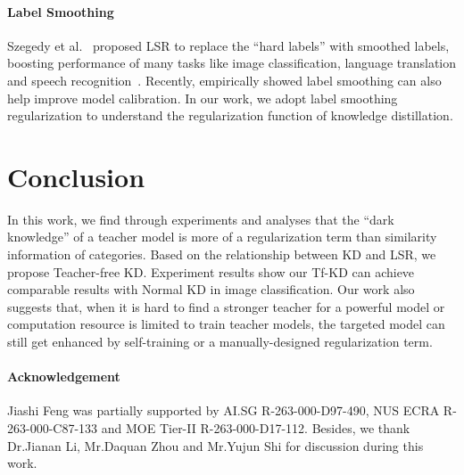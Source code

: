 \documentclass[10pt,twocolumn,letterpaper]{article}
\begin{document}
\vspace{-14pt}
\paragraph{Label Smoothing} Szegedy et al.~\cite{szegedy2016rethinking} proposed LSR to replace the ``hard labels'' with smoothed labels, boosting performance of many tasks like image classification, language translation and speech recognition~\cite{pereyra2017regularizing}. Recently, \cite{muller2019does} empirically showed label smoothing can also help improve model calibration. In our work, we adopt label smoothing regularization to understand the regularization function of knowledge distillation. 

\section{Conclusion}
In this work, we find through experiments and analyses that the ``dark knowledge'' of a teacher model is more of a regularization term than similarity information of categories. Based on the relationship between KD and LSR, we propose Teacher-free KD. Experiment results show our Tf-KD can achieve comparable results with Normal KD in image classification. %
Our work also suggests that, when it is hard to find a stronger teacher for a powerful model or computation resource is limited to train teacher models, the targeted model can still get enhanced by self-training or a manually-designed regularization term. 
\paragraph{Acknowledgement} Jiashi Feng was partially supported by AI.SG R-263-000-D97-490, NUS ECRA R-263-000-C87-133 and MOE Tier-II R-263-000-D17-112. Besides, we thank Dr.Jianan Li, Mr.Daquan Zhou and Mr.Yujun Shi for discussion during this work. 


{\small


}
\end{document}
